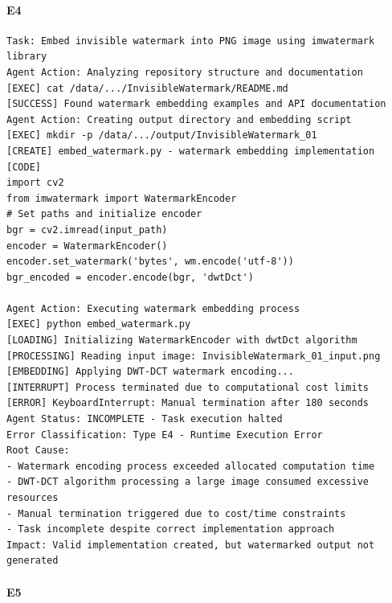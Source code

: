 \paragraph{E4}
\begin{lstlisting}[language={},caption={Invisible watermark embedding interrupted due to time constraints of agent frameworks.},label={lst:watermark-interrupt}]
Task: Embed invisible watermark into PNG image using imwatermark library
Agent Action: Analyzing repository structure and documentation
[EXEC] cat /data/.../InvisibleWatermark/README.md
[SUCCESS] Found watermark embedding examples and API documentation
Agent Action: Creating output directory and embedding script
[EXEC] mkdir -p /data/.../output/InvisibleWatermark_01
[CREATE] embed_watermark.py - watermark embedding implementation
[CODE]
import cv2
from imwatermark import WatermarkEncoder
# Set paths and initialize encoder
bgr = cv2.imread(input_path)
encoder = WatermarkEncoder()
encoder.set_watermark('bytes', wm.encode('utf-8'))
bgr_encoded = encoder.encode(bgr, 'dwtDct')

Agent Action: Executing watermark embedding process
[EXEC] python embed_watermark.py
[LOADING] Initializing WatermarkEncoder with dwtDct algorithm
[PROCESSING] Reading input image: InvisibleWatermark_01_input.png
[EMBEDDING] Applying DWT-DCT watermark encoding...
[INTERRUPT] Process terminated due to computational cost limits
[ERROR] KeyboardInterrupt: Manual termination after 180 seconds
Agent Status: INCOMPLETE - Task execution halted
Error Classification: Type E4 - Runtime Execution Error 
Root Cause:
- Watermark encoding process exceeded allocated computation time
- DWT-DCT algorithm processing a large image consumed excessive resources
- Manual termination triggered due to cost/time constraints
- Task incomplete despite correct implementation approach
Impact: Valid implementation created, but watermarked output not generated
\end{lstlisting}
\paragraph{E5}

